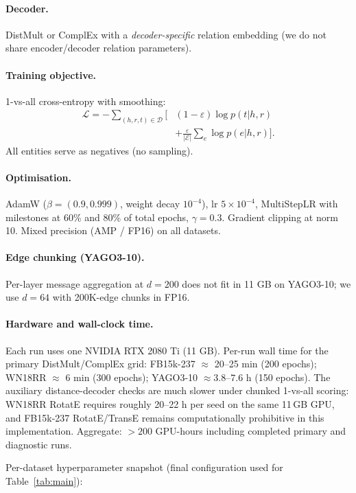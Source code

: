 \paragraph{Decoder.} DistMult or ComplEx with a \emph{decoder-specific} relation embedding (we do not share encoder/decoder relation parameters).

\paragraph{Training objective.} 1-vs-all cross-entropy with smoothing:
\begin{align*}
\mathcal{L} = -\!\!\sum_{(h,r,t) \in \mathcal{D}}\! \Big[
&(1-\varepsilon)\log p(t|h,r) \\
&+ \tfrac{\varepsilon}{|\mathcal{E}|}\sum_{e} \log p(e|h, r)\Big].
\end{align*}
All entities serve as negatives (no sampling).

\paragraph{Optimisation.} AdamW ($\beta = (0.9, 0.999)$, weight decay $10^{-4}$), lr $5\!\times\!10^{-4}$, MultiStepLR with milestones at 60\% and 80\% of total epochs, $\gamma = 0.3$. Gradient clipping at norm 10. Mixed precision (AMP / FP16) on all datasets.

\paragraph{Edge chunking (YAGO3-10).}
Per-layer message aggregation at $d=200$ does not fit in 11 GB on YAGO3-10; we use $d=64$ with 200K-edge chunks in FP16.

\paragraph{Hardware and wall-clock time.}
Each run uses one NVIDIA RTX 2080 Ti (11 GB).
Per-run wall time for the primary DistMult/ComplEx grid: FB15k-237 $\approx$ 20--25 min (200 epochs); WN18RR $\approx$ 6 min (300 epochs); YAGO3-10 $\approx 3.8$--$7.6$ h (150 epochs). The auxiliary distance-decoder checks are much slower under chunked 1-vs-all scoring: WN18RR RotatE requires roughly 20--22 h per seed on the same 11\,GB GPU, and FB15k-237 RotatE/TransE remains computationally prohibitive in this implementation.
Aggregate: $>200$ GPU-hours including completed primary and diagnostic runs.

Per-dataset hyperparameter snapshot (final configuration used for Table~\ref{tab:main}):

